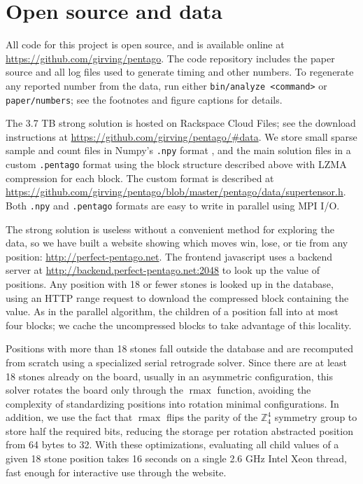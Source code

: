 \documentclass[conference]{IEEEtran}
\newcommand{\Z}{\mathbb{Z}}
\DeclareMathOperator{\rmax}{rmax}
\begin{document}
\section{Open source and data}

All code for this project is open source, and is available online at \url{https://github.com/girving/pentago}.
The code repository includes the paper source and all log files used to generate timing and other numbers.
To regenerate any reported number from the data, run either
\verb+bin/analyze <command>+ or \verb+paper/numbers+; see the footnotes and figure captions for details.

The 3.7 TB strong solution is hosted on Rackspace Cloud Files; see the download instructions at
\url{https://github.com/girving/pentago/#data}.  We store small sparse sample and count files in
Numpy's \verb+.npy+ format \cite{kern2007npy}, and the main solution files in a custom \verb+.pentago+ format
using the block structure described above with LZMA compression for each block.  The custom format is described
at \url{https://github.com/girving/pentago/blob/master/pentago/data/supertensor.h}.  Both \verb+.npy+ and
\verb+.pentago+ formats are easy to write in parallel using MPI I/O.

The strong solution is useless without a convenient method for exploring the data, so we have built a website
showing which moves win, lose, or tie from any position: \url{http://perfect-pentago.net}.  The frontend
javascript uses a backend server at \url{http://backend.perfect-pentago.net:2048} to look up the value of
positions.  Any position with 18 or fewer stones is looked up in the database, using an HTTP range request
to download the compressed block containing the value.  As in the parallel algorithm, the children of a position
fall into at most four blocks; we cache the uncompressed blocks to take advantage of this locality.

Positions with more than 18 stones fall outside the database and are recomputed from scratch using a specialized
serial retrograde solver.  Since there are at least 18 stones already on the board, usually in an asymmetric
configuration, this solver rotates the board only through the $\rmax$ function, avoiding the complexity of
standardizing positions into rotation minimal configurations.  In addition, we use the fact that $\rmax$ flips
the parity of the $\Z_4^4$ symmetry group to store half the required bits, reducing the storage per rotation
abstracted position from 64 bytes to 32.  With these optimizations, evaluating all child values of a given 18
stone position takes 16 seconds on a single 2.6 GHz Intel Xeon thread, fast enough for interactive use through
the website.
\end{document}
